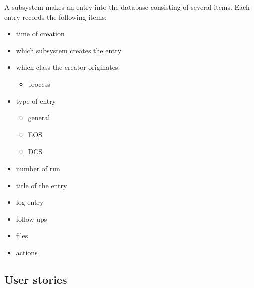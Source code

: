 A subsystem makes an entry into the database consisting of several items. Each entry records the following items:
  \begin{itemize}
    \item time of creation
    \item which subsystem creates the entry
    \item which class the creator originates:
    \begin{itemize}
      \item process
    \end{itemize}
    \item type of entry
    \begin{itemize}
      \item general
      \item EOS
      \item DCS
    \end{itemize}
    \item number of run
    \item title of the entry
    \item log entry
    \item follow ups
    \item files
    \item actions
  \end{itemize}


\subsection{User stories}
